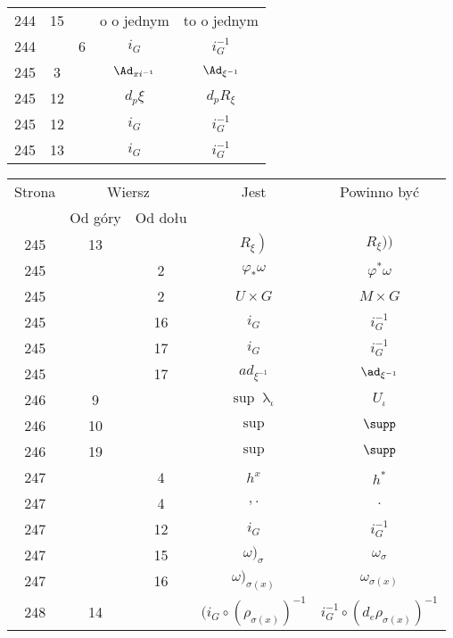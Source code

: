 \documentclass[a4paper,11pt]{article}
\numberwithin{equation}{section}
\renewcommand{\lambda}{\uplambda}
\begin{document}
\begin{center}
\begin{tabular}{|c|c|c|c|c|}
    244 & 15 & & o o jednym & to o jednym \\
    244 & & \hphantom{0}6 & $i_{ G }$ & $i^{ -1 }_{ G }$ \\
    245 & \hphantom{0}3 & & $\Ad_{ xi^{ -1 } }$ & $\Ad_{ \xi^{ -1 } }$ \\
    245 & 12 & & $d_{ p } \xi$ & $d_{ p } R_{ \xi }$ \\
    245 & 12 & & $i_{ G }$ & $i_{ G }^{ -1 }$ \\
    245 & 13 & & $i_{ G }$ & $i_{ G }^{ -1 }$ \\
    \hline
  \end{tabular}





  \newpage

  \begin{tabular}{|c|c|c|c|c|}
    \hline
    Strona & \multicolumn{2}{c|}{Wiersz} & Jest
                              & Powinno być \\ \cline{2-3}
    & Od góry & Od dołu & & \\
    \hline
    245 & 13 & & $\left. R_{ \xi } \right)$ & $ R_{ \xi } ) \big)$ \\
    245 & & \hphantom{0}2 & $\varphi_{ * } \omega$ & $\varphi^{ * } \omega$ \\
    245 & & \hphantom{0}2 & $U \times G$ & $M \times G$ \\
    245 & & 16 & $i_{ G }$ & $i_{ G }^{ -1 }$ \\
    245 & & 17 & $i_{ G }$ & $i_{ G }^{ -1 }$ \\
    245 & & 17 & $ad_{ \xi^{ -1 } }$ & $\ad_{ \xi^{ -1 } }$ \\
    246 & \hphantom{0}9 & & $\sup \lambda_{ \iota }$ & $U_{ \iota }$ \\
    246 & 10 & & $\sup$ & $\supp$ \\
    246 & 19 & & $\sup$ & $\supp$ \\
    247 & & \hphantom{0}4 & $h^{ x }$ & $h^{ * }$ \\
    247 & & \hphantom{0}4 & $, .$ & $.$ \\
    247 & & 12 & $i_{ G }$ & $i_{ G }^{ -1 }$ \\
    247 & & 15 & $\omega )_{ \sigma }$ & $\omega_{ \sigma }$ \\
    247 & & 16 & $\omega )_{ \sigma( x ) }$ & $\omega_{ \sigma( x ) }$ \\
    248 & 14 & & $( i_{ G } \circ ( \rho_{ \sigma( x ) } )^{ -1 }$
           & $i_{ G }^{ -1 } \circ ( d_{ e }\rho_{ \sigma( x ) } )^{ -1 }$ \\

\end{tabular}
\end{center}
\end{document}
